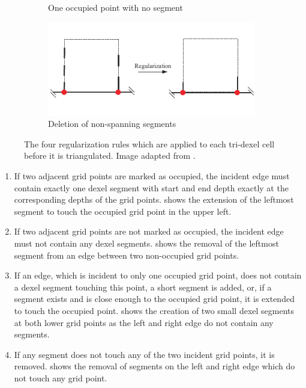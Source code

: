 \begin{figure}[h]
\begin{subfigure}[t]{0.45\textwidth}
		\caption{One occupied point with no segment}
		\label{fig:tri_dexel_regularization_3}
	\end{subfigure}
	\begin{subfigure}[t]{0.45\textwidth}
		\centering
		\includegraphics[width=\textwidth]{images/tri_dexel_regularization_4}
		\caption{Deletion of non-spanning segments}
		\label{fig:tri_dexel_regularization_4}
	\end{subfigure}
	\caption{
		The four regularization rules which are applied to each tri-dexel cell before it is triangulated.
		Image adapted from \cite{tridexel_reconstruction}.
	}
	\label{fig:tri_dexel_regularization}
\end{figure}

\begin{enumerate}
	\item If two adjacent grid points are marked as occupied, the incident edge must contain exactly one dexel segment with start and end depth exactly at the corresponding depths of the grid points.
	 shows the extension of the leftmost segment to touch the occupied grid point in the upper left.

	\item If two adjacent grid points are not marked as occupied, the incident edge must not contain any dexel segments.
	 shows the removal of the leftmost segment from an edge between two non-occupied grid points.

	\item If an edge, which is incident to only one occupied grid point, does not contain a dexel segment touching this point, a short segment is added, or, if a segment exists and is close enough to the occupied grid point, it is extended to touch the occupied point.
	 shows the creation of two small dexel segments at both lower grid points as the left and right edge do not contain any segments.

	\item If any segment does not touch any of the two incident grid points, it is removed.
	 shows the removal of segments on the left and right edge which do not touch any grid point.
\end{enumerate}

